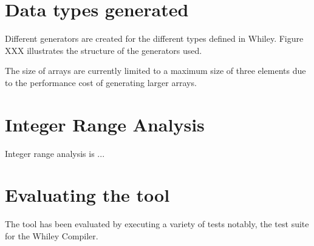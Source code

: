 \section{Data types generated}
Different generators are created for the different types defined in Whiley.
Figure XXX illustrates the structure of the generators used.




The size of arrays are currently limited to a maximum size of three elements due to the performance cost of generating larger arrays.

\section{Integer Range Analysis}

Integer range analysis is ... 

\section{Evaluating the tool}
The tool has been evaluated by executing a variety of tests notably, the test suite for the Whiley Compiler.
